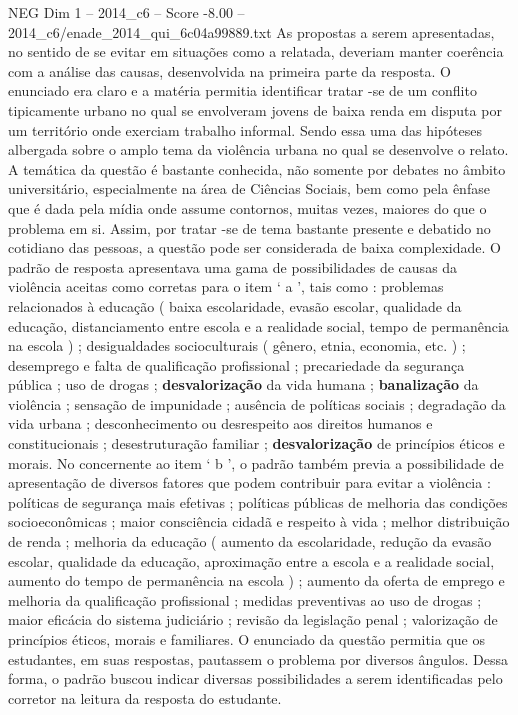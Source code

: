 \begin{textsample}{NEG Dim 1 – 2014\_c6 – Score -8.00 – 2014\_c6/enade\_2014\_qui\_6c04a99889.txt}
As propostas a serem apresentadas, no sentido de se evitar em situações como a relatada, deveriam manter coerência com a análise das causas, desenvolvida na primeira parte da resposta.
O enunciado era claro e a matéria permitia identificar tratar -se de um conflito tipicamente urbano no qual se envolveram jovens de baixa renda em disputa por um território onde exerciam trabalho informal.
Sendo essa uma das hipóteses albergada sobre o amplo tema da violência urbana no qual se desenvolve o relato.
A temática da questão é bastante conhecida, não somente por debates no âmbito universitário, especialmente na área de Ciências Sociais, bem como pela ênfase que é dada pela mídia onde assume contornos, muitas vezes, maiores do que o problema em si.
Assim, por tratar -se de tema bastante presente e debatido no cotidiano das pessoas, a questão pode ser considerada de baixa complexidade.
O padrão de resposta apresentava uma gama de possibilidades de causas da violência aceitas como corretas para o item ‘ a ’, tais como : problemas relacionados à educação ( baixa escolaridade, evasão escolar, qualidade da educação, distanciamento entre escola e a realidade social, tempo de permanência na escola ) ; desigualdades socioculturais ( gênero, etnia, economia, etc. ) ; desemprego e falta de qualificação profissional ; precariedade da segurança pública ; uso de drogas ; \textbf{desvalorização} da vida humana ; \textbf{banalização} da violência ; sensação de impunidade ; ausência de políticas sociais ; degradação da vida urbana ; desconhecimento ou desrespeito aos direitos humanos e constitucionais ; desestruturação familiar ; \textbf{desvalorização} de princípios éticos e morais.
No concernente ao item ‘ b ’, o padrão também previa a possibilidade de apresentação de diversos fatores que podem contribuir para evitar a violência : políticas de segurança mais efetivas ; políticas públicas de melhoria das condições socioeconômicas ; maior consciência cidadã e respeito à vida ; melhor distribuição de renda ; melhoria da educação ( aumento da escolaridade, redução da evasão escolar, qualidade da educação, aproximação entre a escola e a realidade social, aumento do tempo de permanência na escola ) ; aumento da oferta de emprego e melhoria da qualificação profissional ; medidas preventivas ao uso de drogas ; maior eficácia do sistema judiciário ; revisão da legislação penal ; valorização de princípios éticos, morais e familiares.
O enunciado da questão permitia que os estudantes, em suas respostas, pautassem o problema por diversos ângulos.
Dessa forma, o padrão buscou indicar diversas possibilidades a serem identificadas pelo corretor na leitura da resposta do estudante.

\end{textsample}
